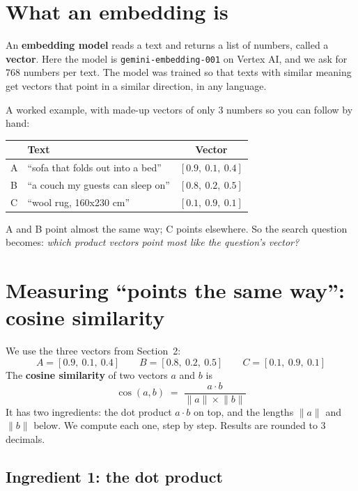 \documentclass[11pt,a4paper]{article}
\newcommand{\code}[1]{\texttt{#1}}
\begin{document}
\section{What an embedding is}

An \textbf{embedding model} reads a text and returns a list of numbers,
called a \textbf{vector}. Here the model is \code{gemini-embedding-001}
on Vertex AI, and we ask for 768 numbers per text. The model was trained
so that texts with similar meaning get vectors that point in a similar
direction, in any language.

A worked example, with made-up vectors of only 3 numbers so you can
follow by hand:

\begin{center}
\begin{tabular}{@{}llc@{}}
\toprule
 & Text & Vector \\
\midrule
A & ``sofa that folds out into a bed'' & $[0.9,\ 0.1,\ 0.4]$ \\
B & ``a couch my guests can sleep on'' & $[0.8,\ 0.2,\ 0.5]$ \\
C & ``wool rug, 160x230 cm''           & $[0.1,\ 0.9,\ 0.1]$ \\
\bottomrule
\end{tabular}
\end{center}

A and B point almost the same way; C points elsewhere. So the search
question becomes: \emph{which product vectors point most like the
question's vector?}

\section{Measuring ``points the same way'': cosine similarity}

We use the three vectors from Section~2:
\[
A = [0.9,\ 0.1,\ 0.4] \qquad B = [0.8,\ 0.2,\ 0.5] \qquad C = [0.1,\ 0.9,\ 0.1]
\]
The \textbf{cosine similarity} of two vectors $a$ and $b$ is
\[
\cos(a, b) \;=\; \frac{a \cdot b}{\lVert a \rVert \times \lVert b \rVert}
\]
It has two ingredients: the dot product $a \cdot b$ on top, and the
lengths $\lVert a \rVert$ and $\lVert b \rVert$ below. We compute each
one, step by step. Results are rounded to 3 decimals.

\subsection{Ingredient 1: the dot product}
\end{document}
